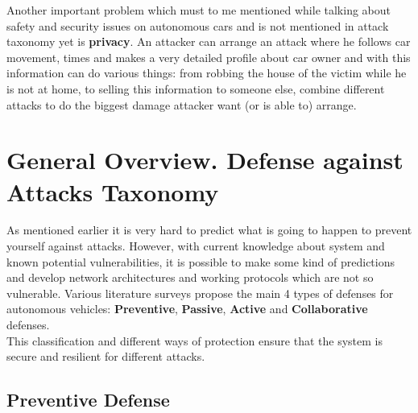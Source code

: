 Another important problem which must to me mentioned while talking about safety and security issues on autonomous cars and is not mentioned in attack taxonomy yet is \textbf{privacy}. An attacker can arrange an attack where he follows car movement, times and makes a very detailed profile about car owner and with this information can do various things: from robbing the house of the victim while he is not at home, to selling this information to someone else, combine different attacks to do the biggest damage attacker want (or is able to) arrange.

\section{General Overview. Defense against Attacks Taxonomy}

As mentioned earlier it is very hard to predict what is going to happen to prevent yourself against attacks. However, with current knowledge about system and known potential vulnerabilities, it is possible to make some kind of predictions and develop network architectures and working protocols which are not so vulnerable. Various literature surveys propose the main 4 types of defenses for autonomous vehicles: \textbf{Preventive}, \textbf{Passive}, \textbf{Active} and \textbf{Collaborative} defenses. \\
This classification and different ways of protection ensure that the system is secure and resilient for different attacks.

\subsection{Preventive Defense}


